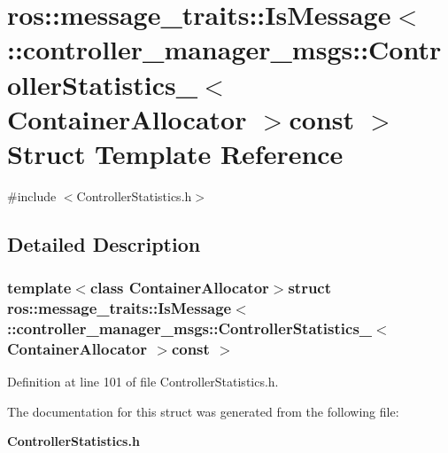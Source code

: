 \section{ros\-:\-:message\-\_\-traits\-:\-:\-Is\-Message$<$ \-:\-:controller\-\_\-manager\-\_\-msgs\-:\-:\-Controller\-Statistics\-\_\-$<$ \-Container\-Allocator $>$const $>$ \-Struct \-Template \-Reference}
\label{structros_1_1message__traits_1_1IsMessage_3_01_1_1controller__manager__msgs_1_1ControllerStatist9b0673c79ed3f4a2ccb1bc63ea041929}


{\ttfamily \#include $<$\-Controller\-Statistics.\-h$>$}



\subsection{\-Detailed \-Description}
\subsubsection*{template$<$class Container\-Allocator$>$struct ros\-::message\-\_\-traits\-::\-Is\-Message$<$ \-::controller\-\_\-manager\-\_\-msgs\-::\-Controller\-Statistics\-\_\-$<$ Container\-Allocator $>$const  $>$}



\-Definition at line 101 of file \-Controller\-Statistics.\-h.



\-The documentation for this struct was generated from the following file\-:\begin{DoxyCompactItemize}
\item 
{\bf \-Controller\-Statistics.\-h}\end{DoxyCompactItemize}
